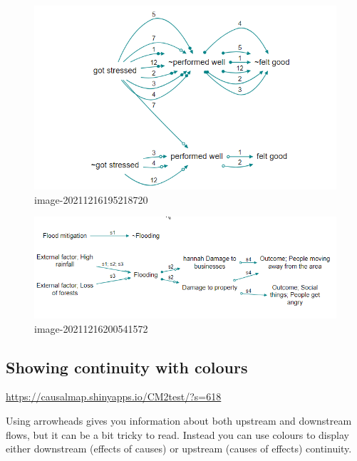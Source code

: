 \documentclass[
]{book}
\begin{document}
\begin{figure}
\centering
\includegraphics[width=6.77083in,height=\textheight]{_assets/image-20211216195218720.png}
\caption{image-20211216195218720}
\end{figure}

\begin{figure}
\centering
\includegraphics[width=6.77083in,height=\textheight]{_assets/image-20211216200541572.png}
\caption{image-20211216200541572}
\end{figure}

\hypertarget{showing-continuity-with-colours}{%
\subsection{Showing continuity with colours}\label{showing-continuity-with-colours}}

\url{https://causalmap.shinyapps.io/CM2test/?s=618}

Using arrowheads gives you information about both upstream and downstream flows, but it can be a bit tricky to read. Instead you can use colours to display either downstream (effects of causes) or upstream (causes of effects) continuity.
\end{document}
